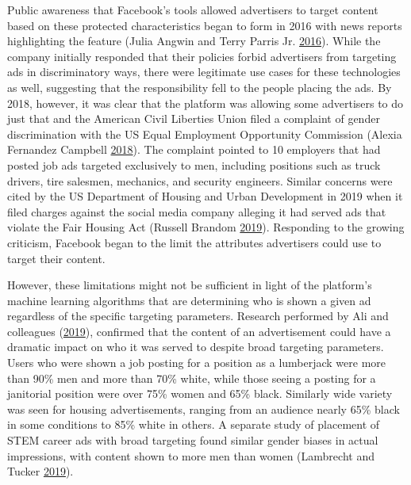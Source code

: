 \documentclass[]{krantz}
\begin{document}
Public awareness that Facebook's tools allowed advertisers to target
content based on these protected characteristics began to form in 2016
with news reports highlighting the feature (Julia Angwin and Terry
Parris Jr. \protect\hyperlink{ref-angwin2016c}{2016}). While the company
initially responded that their policies forbid advertisers from
targeting ads in discriminatory ways, there were legitimate use cases
for these technologies as well, suggesting that the responsibility fell
to the people placing the ads. By 2018, however, it was clear that the
platform was allowing some advertisers to do just that and the American
Civil Liberties Union filed a complaint of gender discrimination with
the US Equal Employment Opportunity Commission (Alexia Fernandez
Campbell \protect\hyperlink{ref-campbell2018}{2018}). The complaint
pointed to 10 employers that had posted job ads targeted exclusively to
men, including positions such as truck drivers, tire salesmen,
mechanics, and security engineers. Similar concerns were cited by the US
Department of Housing and Urban Development in 2019 when it filed
charges against the social media company alleging it had served ads that
violate the Fair Housing Act (Russell Brandom
\protect\hyperlink{ref-brandom2019}{2019}). Responding to the growing
criticism, Facebook began to the limit the attributes advertisers could
use to target their content.

However, these limitations might not be sufficient in light of the
platform's machine learning algorithms that are determining who is shown
a given ad regardless of the specific targeting parameters. Research
performed by Ali and colleagues (\protect\hyperlink{ref-ali2019}{2019}),
confirmed that the content of an advertisement could have a dramatic
impact on who it was served to despite broad targeting parameters. Users
who were shown a job posting for a position as a lumberjack were more
than 90\% men and more than 70\% white, while those seeing a posting for
a janitorial position were over 75\% women and 65\% black. Similarly
wide variety was seen for housing advertisements, ranging from an
audience nearly 65\% black in some conditions to 85\% white in others. A
separate study of placement of STEM career ads with broad targeting
found similar gender biases in actual impressions, with content shown to
more men than women (Lambrecht and Tucker
\protect\hyperlink{ref-lambrecht2019}{2019}).
\end{document}
